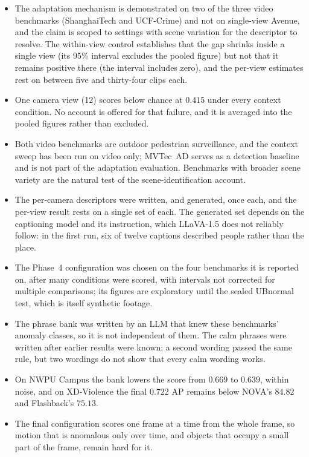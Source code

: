 \documentclass[a4paper,fleqn]{cas-sc}
\begin{document}
\begin{itemize}
        set, there being no separate validation split defined for these
        benchmarks. Held-out figures are reported as means over five clip-level
        partitions with their spread, and the spread is comparable to the
        margins separating the leading configurations---which are consequently
        reported as tied rather than ranked.
  \item The adaptation mechanism is demonstrated on two of the three video
        benchmarks (ShanghaiTech and UCF-Crime) and not on single-view Avenue,
        and the claim is scoped to settings with scene variation for
        the descriptor to resolve. The within-view control establishes that the
        gap shrinks inside a single view (its 95\% interval excludes the pooled
        figure) but not that it remains positive there (the interval includes
        zero), and the per-view estimates rest on between five and thirty-four
        clips each.
  \item One camera view (12) scores below chance at $0.415$ under every context
        condition. No account is offered for that failure, and it is averaged
        into the pooled figures rather than excluded.
  \item Both video benchmarks are outdoor pedestrian surveillance, and the
        context sweep has been run on video only; MVTec~AD serves as a detection
        baseline and is not part of the adaptation evaluation. Benchmarks with
        broader scene variety are the natural test of the scene-identification
        account.
  \item The per-camera descriptors were written, and generated, once each, and
        the per-view result rests on a single set of each. The generated set
        depends on the captioning model and its instruction, which LLaVA-1.5
        does not reliably follow: in the first run, six of twelve captions
        described people rather than the place.
  \item The Phase~4 configuration was chosen on the four benchmarks it is
        reported on, after many conditions were scored, with intervals not
        corrected for multiple comparisons; its figures are exploratory until the
        sealed UBnormal test, which is itself synthetic footage.
  \item The phrase bank was written by an LLM that knew these benchmarks'
        anomaly classes, so it is not independent of them. The calm phrases were
        written after earlier results were known; a second wording passed the
        same rule, but two wordings do not show that every calm wording works.
  \item On NWPU Campus the bank lowers the score from $0.669$ to $0.639$, within
        noise, and on XD-Violence the final $0.722$ AP remains below NOVA's
        $84.82$ and Flashback's $75.13$.
  \item The final configuration scores one frame at a time from the whole frame,
        so motion that is anomalous only over time, and objects that occupy a
        small part of the frame, remain hard for it.
\end{itemize}
\end{document}
